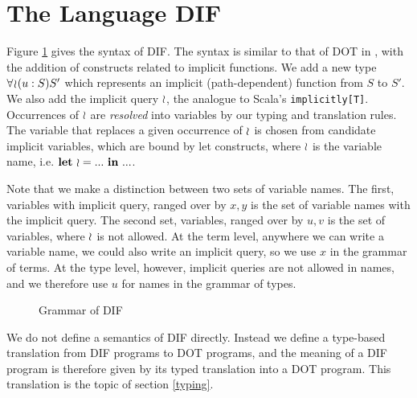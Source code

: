 \section{The Language DIF}
Figure \ref{figure_grammar} gives the syntax of DIF. The syntax is similar to
that of DOT in \cite{AGORS16}, with the addition of constructs related to
implicit functions. We add a new type $\forall\!\wr\!(u:S)S'$ which represents an
implicit (path-dependent) function from $S$ to $S'$. We also add the implicit
query $\wr$, the analogue to Scala's \texttt{implicitly[T]}. Occurrences of
$\wr$ are \emph{resolved} into variables by our typing and translation rules.
The variable that replaces a given occurrence of $\wr$ is chosen from
candidate implicit variables, which are bound by let constructs, where $\wr$
is the variable name, i.e. $\textbf{let}\ \wr = ...\ \textbf{in}\ ...$.

Note that we make a distinction between two sets of variable names. The first,
variables with implicit query, ranged over by $x, y$ is the set of variable
names with the implicit query. The second set, variables, ranged over by $u, v$
is the set of variables, where $\wr$ is not allowed. At the term level,
anywhere we can write a variable name, we could also write an implicit query,
so we use $x$ in the grammar of terms. At the type level, however, implicit
queries are not allowed in names, and we therefore use $u$ for names in the
grammar of types.

\begin{figure}[h]
    
    \caption{Grammar of DIF}
    \label{figure_grammar}
\end{figure}

We do not define a semantics of DIF directly. Instead we define a type-based
translation from DIF programs to DOT programs, and the meaning of a DIF program
is therefore given by its typed translation into a DOT program. This
translation is the topic of section \ref{typing}.
